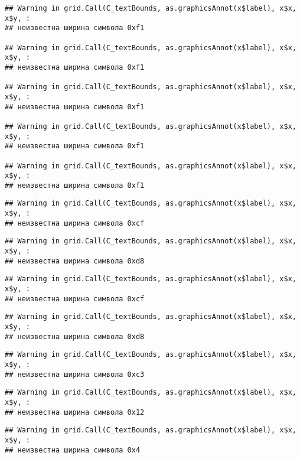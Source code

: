 \documentclass[
]{article}
\begin{document}
\begin{verbatim}
## Warning in grid.Call(C_textBounds, as.graphicsAnnot(x$label), x$x, x$y, :
## неизвестна ширина символа 0xf1

## Warning in grid.Call(C_textBounds, as.graphicsAnnot(x$label), x$x, x$y, :
## неизвестна ширина символа 0xf1

## Warning in grid.Call(C_textBounds, as.graphicsAnnot(x$label), x$x, x$y, :
## неизвестна ширина символа 0xf1

## Warning in grid.Call(C_textBounds, as.graphicsAnnot(x$label), x$x, x$y, :
## неизвестна ширина символа 0xf1

## Warning in grid.Call(C_textBounds, as.graphicsAnnot(x$label), x$x, x$y, :
## неизвестна ширина символа 0xf1
\end{verbatim}

\begin{verbatim}
## Warning in grid.Call(C_textBounds, as.graphicsAnnot(x$label), x$x, x$y, :
## неизвестна ширина символа 0xcf
\end{verbatim}

\begin{verbatim}
## Warning in grid.Call(C_textBounds, as.graphicsAnnot(x$label), x$x, x$y, :
## неизвестна ширина символа 0xd8
\end{verbatim}

\begin{verbatim}
## Warning in grid.Call(C_textBounds, as.graphicsAnnot(x$label), x$x, x$y, :
## неизвестна ширина символа 0xcf
\end{verbatim}

\begin{verbatim}
## Warning in grid.Call(C_textBounds, as.graphicsAnnot(x$label), x$x, x$y, :
## неизвестна ширина символа 0xd8
\end{verbatim}

\begin{verbatim}
## Warning in grid.Call(C_textBounds, as.graphicsAnnot(x$label), x$x, x$y, :
## неизвестна ширина символа 0xc3
\end{verbatim}

\begin{verbatim}
## Warning in grid.Call(C_textBounds, as.graphicsAnnot(x$label), x$x, x$y, :
## неизвестна ширина символа 0x12
\end{verbatim}

\begin{verbatim}
## Warning in grid.Call(C_textBounds, as.graphicsAnnot(x$label), x$x, x$y, :
## неизвестна ширина символа 0x4
\end{verbatim}
\end{document}
